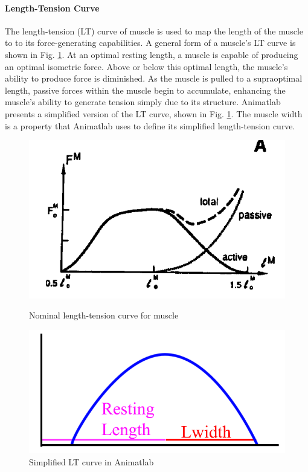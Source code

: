 \documentclass[runningheads,a4paper]{llncs}
\begin{document}
		\paragraph{Length-Tension Curve}
			The length-tension (LT) curve of muscle is used to map the length of the muscle to to its force-generating capabilities. A general form of a muscle's LT curve\cite{zajac_muscle_1989} is shown in Fig. \ref{fig:lwidth3}. At an optimal resting length, a muscle is capable of producing an optimal isometric force. Above or below this optimal length, the muscle's ability to produce force is diminished. As the muscle is pulled to a supraoptimal length, passive forces within the muscle begin to accumulate, enhancing the muscle's ability to generate tension simply due to its structure. Animatlab presents a simplified version of the LT curve, shown in Fig. \ref{fig:lwidth3}. The muscle width is a property that Animatlab uses to define its simplified length-tension curve.  \par
			\begin{figure}
				\centering
				\begin{minipage}{0.53\textwidth}
					\centering
					\includegraphics[width=.7\textwidth]{Figures/lwidth3.PNG}
					\caption{Nominal length-tension curve for muscle}
					\label{fig:lwidth3}
				\end{minipage}\hfill
				\begin{minipage}{0.47\textwidth}
					\centering
					\includegraphics[width=\textwidth]{Figures/lwidth7.png}
					\caption{Simplified LT curve in Animatlab}
				\end{minipage}
			\end{figure}
\end{document}
